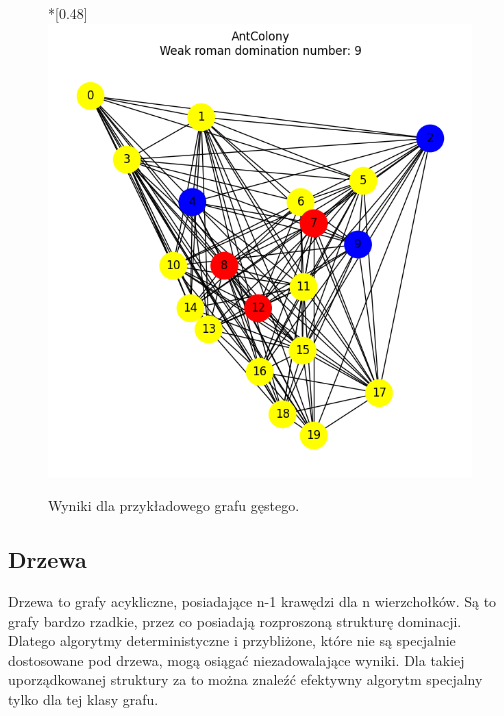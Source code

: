 \begin{figure}[H]
        \hfill
        \begin{subcaptionbox}*{}[0.48\linewidth]
            {\includegraphics[width=0.75\linewidth]{assets/plots/AntColony/ErdosRenyi_dense_n20_i2_results.png}}
        \end{subcaptionbox}
    
        \caption{Wyniki dla przykładowego grafu gęstego.}
        \label{fig:dense}
    \end{figure}

\subsection{Drzewa}

Drzewa to grafy acykliczne, posiadające n-1 krawędzi dla n wierzchołków. Są to grafy bardzo rzadkie, przez co posiadają rozproszoną strukturę dominacji. Dlatego algorytmy deterministyczne i przybliżone, które nie są specjalnie dostosowane pod drzewa, mogą osiągać niezadowalające wyniki. Dla takiej uporządkowanej struktury za to można znaleźć efektywny algorytm specjalny tylko dla tej klasy grafu.

